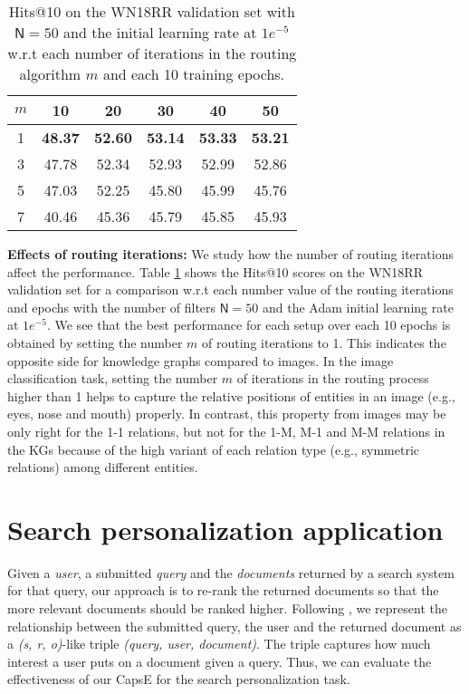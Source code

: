 \documentclass[11pt,a4paper]{article}
\begin{document}
\begin{table}[!t]
\centering
\begin{tabular}{c|ccccc}
\hline
$m$ & 10 & 20 & 30 & 40 & 50\\
\hline
1 & \textbf{48.37} & \textbf{52.60} & \textbf{53.14} & \textbf{53.33} & \textbf{53.21}\\
3 & 47.78 & 52.34 & 52.93 & 52.99 & 52.86\\
5 & 47.03 & 52.25 & 45.80 & 45.99 & 45.76\\
7 & 40.46 & 45.36 & 45.79 & 45.85 & 45.93\\
\hline
\end{tabular}
\caption{Hits@10 on the WN18RR validation set with $\mathsf{N} = 50$ and the initial learning rate at $1e^{-5}$ w.r.t each number of iterations in the routing algorithm $m$ and each 10 training epochs.} 
\label{tab:effectofrouting}
\end{table}

\textbf{Effects of routing iterations:} We study how the number of routing iterations affect the performance.
Table \ref{tab:effectofrouting} shows the Hits@10 scores on the WN18RR validation set for a comparison w.r.t each number value of the routing iterations and epochs with the number of filters $\mathsf{N} = 50$ and the Adam initial learning rate at $1e^{-5}$.
We see that the best performance for each setup over each 10 epochs is obtained by setting the number $m$ of routing iterations to 1. 
This indicates the opposite side for knowledge graphs compared to images. 
In the image classification task, setting the number $m$ of iterations in the routing process higher than 1 helps to capture the relative positions of entities in an image (e.g., eyes, nose and mouth) properly.
In contrast, this property from images may be only right for the 1-1 relations, but not for the 1-M, M-1 and M-M relations in the KGs because of the high variant of each relation type (e.g., symmetric relations) among different entities.



\section{Search personalization application}
\label{subsec:sp}

Given a \textit{user}, a submitted \textit{query} and the \textit{documents} returned by a search system for that query, our approach is to re-rank the returned documents so that the more relevant documents should be ranked higher.  
Following \citet{vu2017search}, we represent the relationship between the submitted query, the user and the returned document as a \textit{(s, r, o)}-like triple \textit{(query, user, document)}. The triple captures how much interest a user puts on a document given a query. 
Thus, we can evaluate the effectiveness of our CapsE for the search personalization task.
\end{document}
